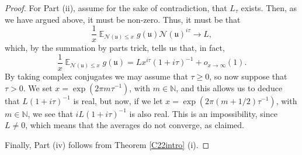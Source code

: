 \documentclass[11pt]{amsart}
\theoremstyle{definition}
\DeclareMathOperator*{\E}{\mathbb{E}}
\newcommand{\N}{{\mathbb N}}
\newcommand{\NN}{{\mathcal N}}
\newcommand{\mf}{\mathfrak}
\newcommand{\WS}[1]{{\color{blue}{{#1}}}}
\begin{document}
\begin{proof}
For Part (ii), assume for the sake of contradiction, that $L_\tau$ exists. Then, as we have argued above, it must be non-zero.
Thus, it must be that
\[
\frac{1}{x}\E_{\NN(\mf u) \leq x} g(\mf u) \NN(\mf u)^{i\tau} \to L,
\]
which, by the summation by parts trick, tells us that, in fact,
\[
\frac{1}{x}\E_{\NN(\mf u) \leq x} g(\mf u)=Lx^{i\tau}(1+i\tau)^{-1}+o_{x\to \infty}(1).
\]
By taking complex conjugates we may assume that $\tau \geq 0$, so now suppose that $\tau>0$. We set $x=\exp(2\pi m\tau^{-1})$, with $m\in \N$, and this allows us to deduce that $L(1+i\tau)^{-1}$ is real, but now, if we let $x=\exp(2\pi(m+1/2)\tau^{-1})$, with $m\in \N$, we see that $iL(1+i\tau)^{-1}$ is also real. This is an impossibility, since $L \neq 0$, which means that the averages do not converge, as claimed.
 

Finally, Part (iv) follows from Theorem \ref{C22intro} (i).
\end{proof}
\end{document}
